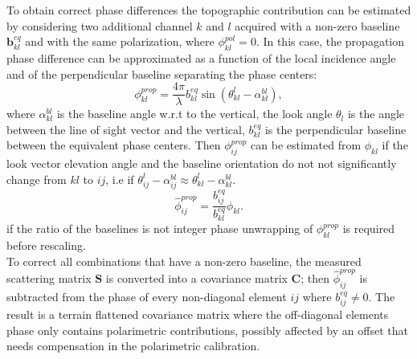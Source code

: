 To obtain correct phase differences the topographic contribution can be estimated by considering two additional channel $k$ and $l$  acquired with  a non-zero baseline $\mathbf{b}_{kl}^{eq}$ and with the same polarization, where $\phi_{kl}^{pol} = 0$. In this case, the propagation phase difference can be approximated as a function of the local incidence angle and of the perpendicular baseline separating the phase centers:
\begin{equation}\label{eq:prop_approximation}
		\phi_{kl}^{prop} = \frac{4\pi}{\lambda} b_{kl}^{eq} \sin(\theta_{kl}^l - \alpha_{kl}^{bl}),
\end{equation}
where $\alpha_{kl}^{bl}$ is the baseline angle w.r.t to the vertical, the look angle $\theta_l$ is the angle between the line of sight vector and the vertical, $b_{kl}^{eq}$ is the perpendicular baseline between the equivalent phase centers. Then $\phi_{ij}^{prop}$ can be estimated from $\phi_{kl}$ if the look vector elevation angle and the baseline orientation do not not significantly change from $kl$ to $ij$, i.e if $\theta_{ij}^l - \alpha_{ij}^{bl} \approx \theta_{kl}^l - \alpha_{kl}^{bl}$. 
\begin{equation}
	\hat{\phi}_{ij}^{prop} = \frac{b_{ij}^{eq}}{b_{kl}^{eq}} \phi_{kl}.
\end{equation}
if the ratio of the baselines is not integer\cite{Massonnet1996} phase unwrapping of $\phi_{kl}^{prop}$ is required before rescaling.\\
To correct all combinations that have a non-zero baseline, the measured scattering matrix $\mathbf{S}$ is converted into a covariance matrix $\mathbf{C}$; then $\hat{\phi}_{ij}^{prop}$ is subtracted from the phase of every non-diagonal element $ij$ where $b_{ij}^{eq} \neq 0$. The result is a terrain flattened covariance matrix where the off-diagonal elements phase only contains polarimetric contributions, possibly affected by an offset that needs compensation in the polarimetric calibration.\\
